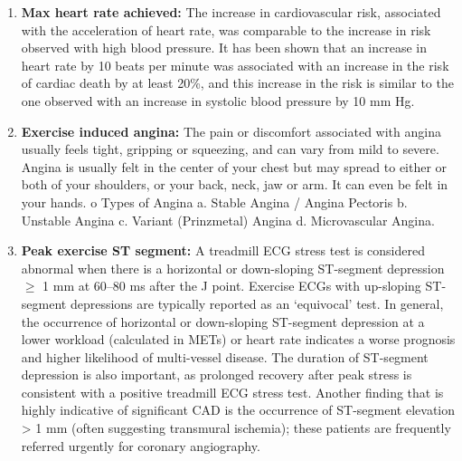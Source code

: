 \documentclass[oneside,12pt]{Classes/VTU}
\begin{document}
\begin{enumerate}
		\item \textbf{Max heart rate achieved:} The increase in cardiovascular risk, associated with the acceleration of heart rate, was comparable to the increase in risk observed with high blood pressure. It has been shown that an increase in heart rate by 10 beats per minute was associated with an increase in the risk of cardiac death by at least 20\%, and this increase in the risk is similar to the one observed with an increase in systolic blood pressure by 10 mm Hg.
		
		\item \textbf{Exercise induced angina:} The pain or discomfort associated with angina usually feels tight, gripping or squeezing, and can vary from mild to severe. Angina is usually felt in the center of your chest but may spread to either or both of your shoulders, or your back, neck, jaw or arm. It can even be felt in your hands. o Types of Angina a. Stable Angina / Angina Pectoris b. Unstable Angina c. Variant (Prinzmetal) Angina d. Microvascular Angina.
		
		\item \textbf{Peak exercise ST segment:} A treadmill ECG stress test is considered abnormal when there is a horizontal or down-sloping ST-segment depression $\geq$ 1 mm at 60–80 ms after the J point. Exercise ECGs with up-sloping ST-segment depressions are typically reported as an ‘equivocal’ test. In general, the occurrence of horizontal or down-sloping ST-segment depression at a lower workload (calculated in METs) or heart rate indicates a worse prognosis and higher likelihood of multi-vessel disease. The duration of ST-segment depression is also important, as prolonged recovery after peak stress is consistent with a positive treadmill ECG stress test. Another finding that is highly indicative of significant CAD is the occurrence of ST-segment elevation > 1 mm (often suggesting transmural ischemia); these patients are frequently referred urgently for coronary angiography.
	\end{enumerate}
\end{document}

